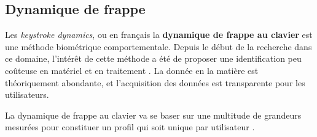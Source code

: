 \subsection{Dynamique de frappe}
Les \textit{keystroke dynamics}, ou en français la \textbf{dynamique de frappe au clavier} est une méthode biométrique comportementale. Depuis le début de la recherche dans ce domaine, l'intérêt de cette méthode a été de proposer une identification peu coûteuse en matériel et en traitement \cite{monrose1997}. La donnée en la matière est théoriquement abondante, et l'acquisition des données est transparente pour les utilisateurs.




La dynamique de frappe au clavier va se baser sur une multitude de grandeurs mesurées pour constituer un profil qui soit unique par utilisateur \cite{giotThese}.
